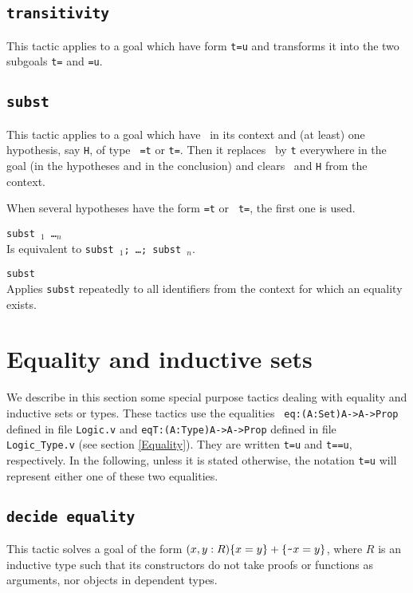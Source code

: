 \subsection{\tt transitivity \term}
This tactic applies to a goal which have form {\tt t=u}
and transforms it into the two subgoals 
{\tt t={\term}} and {\tt {\term}=u}.

\subsection{\tt subst {\ident}}
This tactic applies to a goal which have \ident\ in its context and
(at least) one hypothesis, say {\tt H}, of type {\tt
  \ident=t} or {\tt t=\ident}. Then it replaces 
\ident\ by {\tt t} everywhere in the goal (in the hypotheses 
and in the conclusion) and clears \ident\ and {\tt H} from the context.

\Rem 
When several hypotheses have the form {\tt \ident=t} or {\tt
  t=\ident}, the first one is used. 

\begin{Variants}
  \item {\tt subst \ident$_1$ \dots \ident$_n$} \\
    Is equivalent to {\tt subst \ident$_1$; \dots; subst \ident$_n$}.
  \item {\tt subst} \\
    Applies {\tt subst} repeatedly to all identifiers from the context
    for which an equality exists.
\end{Variants}


\section{Equality and inductive sets}
We describe in this section some special purpose
tactics dealing with equality and inductive sets or
types.  These tactics use the equalities {\tt
eq:(A:Set)A->A->Prop} defined in file {\tt Logic.v}
and {\tt eqT:(A:Type)A->A->Prop} defined in file
{\tt Logic\_Type.v} (see section \ref{Equality}).
They are written {\tt t=u} and {\tt t==u},
respectively. In the following, unless it is stated
otherwise, the notation {\tt t=u} will represent
either one of these two equalities.

\subsection{\tt decide equality}
\label{decideequality}
This tactic solves a goal of the form
$(x,y:R)\{x=y\}+\{\verb|~|x=y\}$, where $R$ is an inductive type
such that its constructors do not take proofs or functions as
arguments, nor objects in dependent types.

